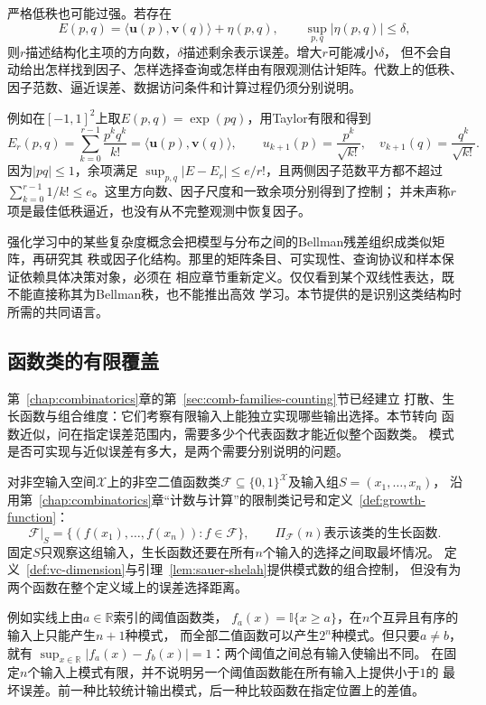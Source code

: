 严格低秩也可能过强。若存在
\[
  E(p,q)
  =
  \langle\bm{u}(p),\bm{v}(q)\rangle+\eta(p,q),
  \qquad
  \sup_{p,q}|\eta(p,q)|\leq\delta,
\]
则$r$描述结构化主项的方向数，$\delta$描述剩余表示误差。增大$r$可能减小$\delta$，
但不会自动给出怎样找到因子、怎样选择查询或怎样由有限观测估计矩阵。代数上的低秩、
因子范数、逼近误差、数据访问条件和计算过程仍须分别说明。

例如在$[-1,1]^2$上取$E(p,q)=\exp(pq)$，用Taylor有限和得到
\[
 E_r(p,q)=\sum_{k=0}^{r-1}\frac{p^kq^k}{k!}
 =\langle\bm u(p),\bm v(q)\rangle,\qquad
 u_{k+1}(p)=\frac{p^k}{\sqrt{k!}},\quad
 v_{k+1}(q)=\frac{q^k}{\sqrt{k!}}.
\]
因为$|pq|\leq1$，余项满足
$\sup_{p,q}|E-E_r|\leq e/r!$，且两侧因子范数平方都不超过
$\sum_{k=0}^{r-1}1/k!\leq e$。这里方向数、因子尺度和一致余项分别得到了控制；
并未声称$r$项是最佳低秩逼近，也没有从不完整观测中恢复因子。

强化学习中的某些复杂度概念会把模型与分布之间的Bellman残差组织成类似矩阵，再研究其
秩或因子化结构。那里的矩阵条目、可实现性、查询协议和样本保证依赖具体决策对象，必须在
相应章节重新定义。仅仅看到某个双线性表达，既不能直接称其为Bellman秩，也不能推出高效
学习。本节提供的是识别这类结构时所需的共同语言。

\subsection{函数类的有限覆盖}
\label{sec:functional-combinatorial-metric-complexity}

第~\ref{chap:combinatorics}章的第~\ref{sec:comb-families-counting}节已经建立
打散、生长函数与组合维度：它们考察有限输入上能独立实现哪些输出选择。本节转向
函数近似，问在指定误差范围内，需要多少个代表函数才能近似整个函数类。
模式是否可实现与近似误差有多大，是两个需要分别说明的问题。

对非空输入空间$\mathcal X$上的非空二值函数类$\mathcal F\subseteq\{0,1\}^{\mathcal X}$及输入组$S=(x_1,\ldots,x_n)$，
沿用第~\ref{chap:combinatorics}章“计数与计算”的限制类记号和定义~\ref{def:growth-function}：
\begin{equation}
 \mathcal F|_S=\{(f(x_1),\ldots,f(x_n)):f\in\mathcal F\},
 \qquad \Pi_{\mathcal F}(n)\text{表示该类的生长函数}.
 \label{eq:functional-growth-function}
\end{equation}
固定$S$只观察这组输入，生长函数还要在所有$n$个输入的选择之间取最坏情况。
定义~\ref{def:vc-dimension}与引理~\ref{lem:sauer-shelah}提供模式数的组合控制，
但没有为两个函数在整个定义域上的误差选择距离。

例如实线上由$a\in\mathbb R$索引的阈值函数类，
$f_a(x)=\mathbb{I}\{x\geq a\}$，在$n$个互异且有序的输入上只能产生$n+1$种模式，
而全部二值函数可以产生$2^n$种模式。但只要$a\neq b$，就有
$\sup_{x\in\mathbb R}|f_a(x)-f_b(x)|=1$：两个阈值之间总有输入使输出不同。
在固定$n$个输入上模式有限，并不说明另一个阈值函数能在所有输入上提供小于$1$的
最坏误差。前一种比较统计输出模式，后一种比较函数在指定位置上的差值。

